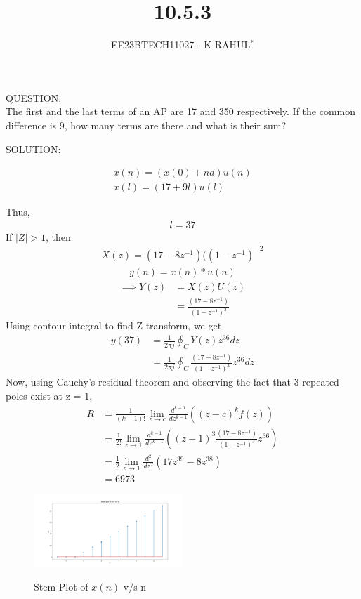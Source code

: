 \documentclass[journal,12pt,twocolumn]{IEEEtran}
\theoremstyle{remark}
\begin{document}

\vspace{3cm}
\title{10.5.3}
\author{EE23BTECH11027 - K RAHUL$^{*}$%
}
\maketitle
\newpage
\bigskip
\renewcommand{\thefigure}{\theenumi}
\renewcommand{\thetable}{\theenumi}
QUESTION:\\
The first and the last terms of an AP are 17 and 350 respectively. If the common difference
is 9, how many terms are there and what is their sum?\\
\bigskip \bigskip


SOLUTION:
\begin{table}[ht]

\end{table}
\begin{align}
x(n) = (x(0) + nd)u(n)\\
x(l)=(17+9l)u(l)
\end{align}

Thus,
\begin{align}{l = 37}\end{align}
If $|Z|>1$, then
\begin{align}\label{8}X(z) = (17-8z^{-1})({(1-z^{-1})}^{-2}\end{align}
\begin{align}y(n) = x(n) * u(n)\end{align}
\begin{align}\implies Y(z) &= X(z)U(z)\\
&= \frac{(17-8z^{-1})}{(1-z^{-1})^{3}}\end{align}
\bigskip
Using contour integral to find Z transform, we get
\begin{align}
    y(37) &= \frac{1}{2\pi j} \oint _C Y(z)z^{36}dz\\
    &= \frac{1}{2\pi j} \oint _C \frac{(17-8z^{-1})}{(1-z^{-1})^{3}}z^{36}dz
\end{align}
Now, using Cauchy's residual theorem and observing the fact that 3 repeated poles exist at z = 1, 
\begin{align}
    R &= \frac{1}{(k-1)!}\lim_{z \to c}\frac{d^{k-1}}{dz^{k-1}}((z-c)^kf(z))\\
    &= \frac{1}{2!}\lim_{z \to 1}\frac{d^{k-1}}{dz^{k-1}}((z-1)^3\frac{(17-8z^{-1})}{(1-z^{-1})^{3}}z^{36})\\
    &=\frac{1}{2}\lim_{z \to 1}\frac{d^2}{dz^2}(17z^{39} - 8z^{38})\\
    &= 6973
\end{align}
\begin{figure}[h]
    \includegraphics[width=0.5\textwidth]{figs/x(n)_plot.png}\label{fig:stem-plot}
    \caption{Stem Plot of $x(n)$ v/s n}
\end{figure}
\end{document}
